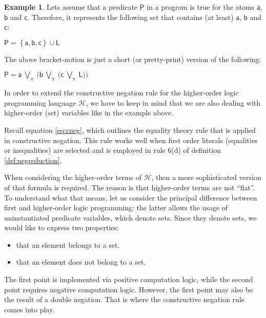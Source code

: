 \documentclass[inscr,ack,preface]{dithesis}
\theoremstyle{definition}
\newtheorem{example}{Example}[chapter]
\newcommand{\h}{$\mathcal{H}$}
\newcommand{\msf}[1]{$\mathsf{#1}$}
\begin{document}
\begin{example} Lets assume that a predicate \msf{P} in a program is true for the atoms \msf{a}, \msf{b} and \msf{c}. Therefore, it represents the following set that contains (at least) \msf{a}, \msf{b} and \msf{c}:
\begin{center}
  \msf{P = \left\{ a, b, c \right\} \cup L}
\end{center}

The above bracket-notion is just a short (or pretty-print) version of the following:
\begin{center}
  \msf{P = a ~\bigvee_{\pi}~ \big( b ~\bigvee_{\pi}~ \big( c ~\bigvee_{\pi}~ L \big) \big)}
\end{center}

\end{example}

In order to extend the constructive negation rule for the higher-order logic programming language \h{}, we have to keep in mind that we are also dealing with higher-order (set) variables like in the example above.

Recall equation \ref{eq:cneg}, which outlines the equality theory rule that is applied in constructive negation. This rule works well when first order literals (equalities or inequalities) are selected and is employed in rule 6(d) of definition \ref{def:negreduction}.

When considering the higher-order terms of \h{}, then a more sophisticated version of that formula is required. The reason is that higher-order terms are not ``flat''. To understand what that means, let us consider the principal difference between first and higher-order logic programming: the latter allows the usage of uninstantiated predicate variables, which denote sets. Since they denote sets, we would like to express two properties:
\begin{itemize}
  \item that an element belongs to a set.
  \item that an element does not belong to a set.
\end{itemize}
The first point is implemented via positive computation logic, while the second point requires negative computation logic. However, the first point may also be the result of a double negation. That is where the constructive negation rule comes into play.

\end{document}
